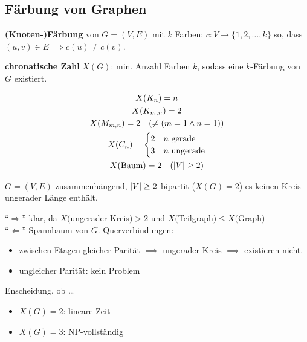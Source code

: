 \subsection{Färbung von Graphen}
\begin{def*}[note = Knotenfärbung , index = Knotenfärbung]
	\textbf{(Knoten-)Färbung} von $G=(V,E)$ mit $k$ Farben: $c: V \rightarrow \{ 1, 2, \dotsc , k \}$ so, dass $(u,v) \in E \implies c(u) \neq c(v)$.
\end{def*}
\begin{def*}[note = chromatische Zahl , index = chromatische Zahl]
	\textbf{chronatische Zahl} $X(G)$: min. Anzahl Farben $k$, sodass eine $k$-Färbung von $G$ existiert.
\end{def*}
\begin{bsp*}
	\begin{gather*}
		X(K_n) = n \\
		X(K_{m,n}) = 2 \\
		X(M_{m,n}) = 2 \quad ( \neq( m = 1 \wedge n = 1 )) \\
		X(C_n) = \begin{cases}
			2	&n \text{ gerade}	\\
			3	&n \text{ ungerade}
		\end{cases} \\
		X(\text{Baum}) = 2 \quad ( \abs{V} \geq 2 )
	\end{gather*}
\end{bsp*}
\begin{satz*}
	$G=(V,E)$ zusammenhängend, $\abs{V} \geq 2$ bipartit ($X(G) = 2$) \gdw es keinen Kreis ungerader Länge enthält.\\
	\begin{bew}
		\enquote{$\Rightarrow$} klar, da $X($ungerader Kreis$) > 2$ und $X($Teilgraph$) \leq X($Graph$)$ \\
		\enquote{$\Leftarrow$} Spannbaum von $G$. Querverbindungen:
		\begin{itemize}
			\item zwischen Etagen gleicher Parität $\implies$ ungerader Kreis $\implies$ existieren nicht.
			\item ungleicher Parität: kein Problem
		\end{itemize}
	\end{bew}
\end{satz*}

Enscheidung, ob \dots
\begin{itemize}
	\item $X(G) = 2$: lineare Zeit
	\item $X(G) = 3$: NP-vollständig
\end{itemize}

